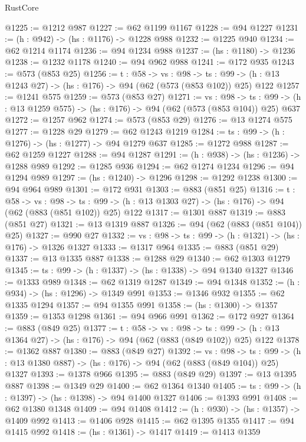 \begin{lexlean}{RustCore}
\begin{coremodule}
@1225 := @1212 @987
@1227 := @62 @1199 @1167
@1228 := @94 @1227
@1231 := (h : @942) -> (hs : @1176) -> @1228 @988
@1232 := @1225 @940
@1234 := @62 @1214 @1174
@1236 := @94 @1234 @988
@1237 := (hs : @1180) -> @1236
@1238 := @1232 @1178
@1240 := @94 @962 @988
@1241 := @172 @935
@1243 := @573 (@853 @25)
@1256 := {t : @58} ->
  {vs : @98} ->
  {ts : @99} -> (h : @13 @1243 @27) -> (hs : @176) -> @94 (@62 (@573 (@853 @102)) @25) @122
@1257 := @1241 @575
@1259 := @573 (@853 @27)
@1271 := {vs : @98} ->
  {ts : @99} -> (h : @13 @1259 @575) -> (hs : @176) -> @94 (@62 (@573 (@853 @104)) @25) @637
@1272 := @1257 @962
@1274 := @573 (@853 @29)
@1276 := @13 @1274 @575
@1277 := @1228 @29
@1279 := @62 @1243 @1219
@1284 := {ts : @99} -> (h : @1276) -> (hs : @1277) -> @94 @1279 @637
@1285 := @1272 @988
@1287 := @62 @1259 @1227
@1288 := @94 @1287
@1291 := (h : @938) -> (hs : @1236) -> @1288 @989
@1292 := @1285 @936
@1294 := @62 @1274 @1234
@1296 := @94 @1294 @989
@1297 := (hs : @1240) -> @1296
@1298 := @1292 @1238
@1300 := @94 @964 @989
@1301 := @172 @931
@1303 := @883 (@851 @25)
@1316 := {t : @58} ->
  {vs : @98} ->
  {ts : @99} -> (h : @13 @1303 @27) -> (hs : @176) -> @94 (@62 (@883 (@851 @102)) @25) @122
@1317 := @1301 @887
@1319 := @883 (@851 @27)
@1321 := @13 @1319 @887
@1326 := @94 (@62 (@883 (@851 @104)) @25)
@1327 := @990 @27
@1332 := {vs : @98} -> {ts : @99} -> (h : @1321) -> (hs : @176) -> @1326 @1327
@1333 := @1317 @964
@1335 := @883 (@851 @29)
@1337 := @13 @1335 @887
@1338 := @1288 @29
@1340 := @62 @1303 @1279
@1345 := {ts : @99} -> (h : @1337) -> (hs : @1338) -> @94 @1340 @1327
@1346 := @1333 @989
@1348 := @62 @1319 @1287
@1349 := @94 @1348
@1352 := (h : @934) -> (hs : @1296) -> @1349 @991
@1353 := @1346 @932
@1355 := @62 @1335 @1294
@1357 := @94 @1355 @991
@1358 := (hs : @1300) -> @1357
@1359 := @1353 @1298
@1361 := @94 @966 @991
@1362 := @172 @927
@1364 := @883 (@849 @25)
@1377 := {t : @58} ->
  {vs : @98} ->
  {ts : @99} -> (h : @13 @1364 @27) -> (hs : @176) -> @94 (@62 (@883 (@849 @102)) @25) @122
@1378 := @1362 @887
@1380 := @883 (@849 @27)
@1392 := {vs : @98} ->
  {ts : @99} -> (h : @13 @1380 @887) -> (hs : @176) -> @94 (@62 (@883 (@849 @104)) @25) @1327
@1393 := @1378 @966
@1395 := @883 (@849 @29)
@1397 := @13 @1395 @887
@1398 := @1349 @29
@1400 := @62 @1364 @1340
@1405 := {ts : @99} -> (h : @1397) -> (hs : @1398) -> @94 @1400 @1327
@1406 := @1393 @991
@1408 := @62 @1380 @1348
@1409 := @94 @1408
@1412 := (h : @930) -> (hs : @1357) -> @1409 @992
@1413 := @1406 @928
@1415 := @62 @1395 @1355
@1417 := @94 @1415 @992
@1418 := (hs : @1361) -> @1417
@1419 := @1413 @1359

\end{coremodule}
\end{lexlean}
